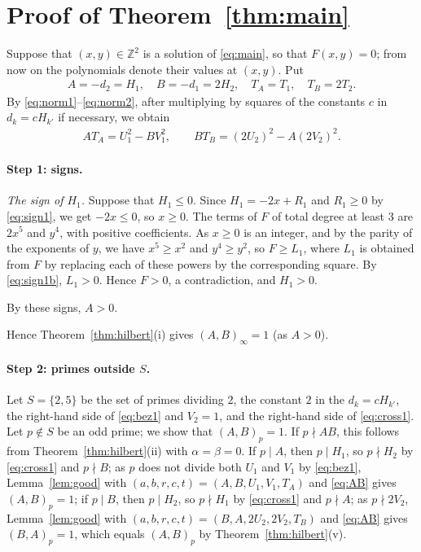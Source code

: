 \documentclass[11pt]{article}
\newcommand{\Z}{\mathbb{Z}}
\begin{document}
\section{Proof of Theorem~\ref{thm:main}}

Suppose that $(x,y)\in\Z^2$ is a solution of \eqref{eq:main}, so that $F(x,y)=0$; from now on the polynomials denote their values at $(x,y)$. Put
\begin{gather*}
A=-d_{2}=H_{1},\quad B=-d_{1}=2H_{2},\quad T_A=T_{1},\quad T_B=2T_{2}.
\end{gather*}
By \eqref{eq:norm1}--\eqref{eq:norm2}, after multiplying by squares of the constants $c$ in $d_k=cH_{k'}$ if necessary, we obtain
\begin{align}
AT_A=U_{1}^2-BV_{1}^2,\qquad BT_B=(2U_{2})^2-A(2V_{2})^2.\label{eq:AB}
\end{align}

\paragraph{Step 1: signs.} \emph{The sign of $H_{1}$.} Suppose that $H_{1}\leq0$. Since $H_{1}=-2x+R_{1}$ and $R_{1}\geq0$ by \eqref{eq:sign1}, we get $-2x\leq0$, so $x\geq0$. The terms of $F$ of total degree at least $3$ are $2x^{5}$ and $y^{4}$, with positive coefficients. As $x\geq0$ is an integer, and by the parity of the exponents of $y$, we have $x^{5}\geq x^2$ and $y^{4}\geq y^2$, so $F\geq L_{1}$, where $L_{1}$ is obtained from $F$ by replacing each of these powers by the corresponding square. By \eqref{eq:sign1b}, $L_{1}>0$. Hence $F>0$, a contradiction, and $H_{1}>0$.

By these signs, $A>0$.

Hence Theorem~\ref{thm:hilbert}(i) gives $(A,B)_\infty=1$ (as $A>0$).

\paragraph{Step 2: primes outside $S$.} Let $S=\{2,5\}$ be the set of primes dividing $2$, the constant $2$ in the $d_k=cH_{k'}$, the right-hand side of \eqref{eq:bez1} and $V_{2}=1$, and the right-hand side of \eqref{eq:cross1}. Let $p\notin S$ be an odd prime; we show that $(A,B)_p=1$. If $p\nmid AB$, this follows from Theorem~\ref{thm:hilbert}(ii) with $\alpha=\beta=0$. If $p\mid A$, then $p\mid H_{1}$, so $p\nmid H_{2}$ by \eqref{eq:cross1} and $p\nmid B$; as $p$ does not divide both $U_{1}$ and $V_{1}$ by \eqref{eq:bez1}, Lemma~\ref{lem:good} with $(a,b,r,c,t)=(A,B,U_{1},V_{1},T_A)$ and \eqref{eq:AB} gives $(A,B)_p=1$; if $p\mid B$, then $p\mid H_{2}$, so $p\nmid H_{1}$ by \eqref{eq:cross1} and $p\nmid A$; as $p\nmid 2V_{2}$, Lemma~\ref{lem:good} with $(a,b,r,c,t)=(B,A,2U_{2},2V_{2},T_B)$ and \eqref{eq:AB} gives $(B,A)_p=1$, which equals $(A,B)_p$ by Theorem~\ref{thm:hilbert}(v).
\end{document}
